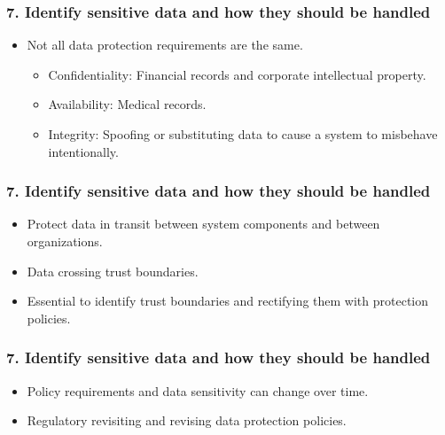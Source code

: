 \documentclass[12pt,norsk]{beamer}
\begin{document}
\begin{frame}

	\frametitle{7. Identify sensitive data and how they should be handled}
	\begin{itemize}

		\item Not all data protection requirements are the same.
		\begin{itemize}
			\item Confidentiality: Financial records and corporate intellectual property.
			\item Availability: Medical records.
			\item Integrity: Spoofing or substituting data to cause a system to misbehave intentionally.
		\end{itemize}
		
		
	\end{itemize}
	

\end{frame}

\begin{frame}

	\frametitle{7. Identify sensitive data and how they should be handled}
	\begin{itemize}

		\item Protect data in transit between system components and between organizations.
		\item Data crossing trust boundaries.
		\item Essential to identify trust boundaries and rectifying them with protection policies.
		
		
		
	\end{itemize}
	

\end{frame}


\begin{frame}

	\frametitle{7. Identify sensitive data and how they should be handled}
	\begin{itemize}

		\item Policy requirements and data sensitivity can change over time.
		\item Regulatory revisiting and revising data protection policies.		
		
	\end{itemize}
	

\end{frame}
\end{document}
